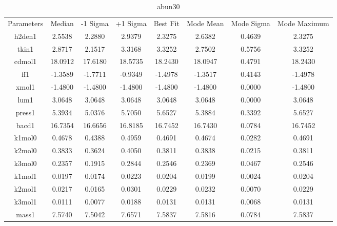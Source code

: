 \begin{table}
\caption{abun30}
\begin{tabular}{cccccccc}
Parameters & Median & -1 Sigma & +1 Sigma & Best Fit & Mode Mean & Mode Sigma & Mode Maximum \\
h2den1 & 2.5538 & 2.2880 & 2.9379 & 2.3275 & 2.6382 & 0.4639 & 2.3275 \\
tkin1 & 2.8717 & 2.1517 & 3.3168 & 3.3252 & 2.7502 & 0.5756 & 3.3252 \\
cdmol1 & 18.0912 & 17.6180 & 18.5735 & 18.2430 & 18.0947 & 0.4791 & 18.2430 \\
ff1 & -1.3589 & -1.7711 & -0.9349 & -1.4978 & -1.3517 & 0.4143 & -1.4978 \\
xmol1 & -1.4800 & -1.4800 & -1.4800 & -1.4800 & -1.4800 & 0.0000 & -1.4800 \\
lum1 & 3.0648 & 3.0648 & 3.0648 & 3.0648 & 3.0648 & 0.0000 & 3.0648 \\
press1 & 5.3934 & 5.0376 & 5.7050 & 5.6527 & 5.3884 & 0.3392 & 5.6527 \\
bacd1 & 16.7354 & 16.6656 & 16.8185 & 16.7452 & 16.7430 & 0.0784 & 16.7452 \\
k1mol0 & 0.4678 & 0.4388 & 0.4959 & 0.4691 & 0.4674 & 0.0282 & 0.4691 \\
k2mol0 & 0.3833 & 0.3624 & 0.4050 & 0.3811 & 0.3838 & 0.0215 & 0.3811 \\
k3mol0 & 0.2357 & 0.1915 & 0.2844 & 0.2546 & 0.2369 & 0.0467 & 0.2546 \\
k1mol1 & 0.0197 & 0.0174 & 0.0223 & 0.0204 & 0.0199 & 0.0024 & 0.0204 \\
k2mol1 & 0.0217 & 0.0165 & 0.0301 & 0.0229 & 0.0232 & 0.0070 & 0.0229 \\
k3mol1 & 0.0111 & 0.0077 & 0.0188 & 0.0131 & 0.0131 & 0.0068 & 0.0131 \\
mass1 & 7.5740 & 7.5042 & 7.6571 & 7.5837 & 7.5816 & 0.0784 & 7.5837 \\
\end{tabular}
\end{table}
